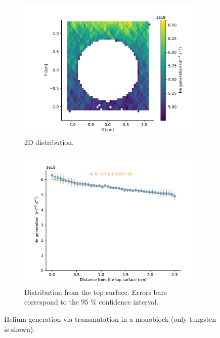 \begin{figure}
    \centering
    \begin{subfigure}{0.5\linewidth}
        \includegraphics[width=\linewidth]{Figures/Chapter5/helium_transmutation_in_monoblock.pdf}
        \caption{2D distribution.}
    \end{subfigure}%
    \begin{subfigure}{0.5\linewidth}
        \includegraphics[width=\linewidth]{Figures/Chapter5/he_generation_distribution.pdf}
        \caption{Distribution from the top surface. Errors bars correspond to the 95 \% confidence interval.}
    \end{subfigure}
    \caption{Helium generation via transmutation in a monoblock (only tungsten is shown).}
\end{figure}

